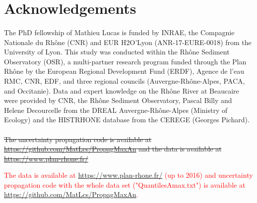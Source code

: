 \documentclass[11pt]{article}
\begin{document}
\section{Acknowledgements}
\paragraph{}
The PhD fellowship of Mathieu Lucas is funded by INRAE, the Compagnie Nationale du Rhône (CNR) and EUR H2O’Lyon (ANR-17-EURE-0018) from the University of Lyon. This study was conducted within the Rhône Sediment Observatory (OSR), a multi-partner research program funded through the Plan Rhône by the European Regional Development Fund (ERDF), Agence de l'eau RMC, CNR, EDF, and three regional councils (Auvergne-Rhône-Alpes, PACA, and Occitanie). Data and expert knowledge on the Rhône River at Beaucaire were provided by CNR, the Rhône Sediment Observatory, Pascal Billy and Helene Decourcelle from the DREAL Auvergne-Rhône-Alpes (Ministry of Ecology) and the HISTRHONE database from the CEREGE (Georges Pichard).
\paragraph{}
\sout{
The uncertainty propagation code is available at \url{https://github.com/MatLcs/PropagMaxAn} and the data is available at \href{https://www.plan-rhone.fr/publications-131/actualisation-de-lhydrologie-des-crues-du-rhone-1865.html?cHash=5628938abe287dc9ca390dad7373ae0e}{https://www.plan-rhone.fr/}}

\textcolor{red}{
The data is available at \href{https://www.plan-rhone.fr/publications-131/actualisation-de-lhydrologie-des-crues-du-rhone-1865.html?cHash=5628938abe287dc9ca390dad7373ae0e}{https://www.plan-rhone.fr/} (up to 2016) and uncertainty propagation code with the whole data set ("QuantilesAmax.txt") is available at \url{https://github.com/MatLcs/PropagMaxAn}.}

\printbibliography

        
\end{document}
